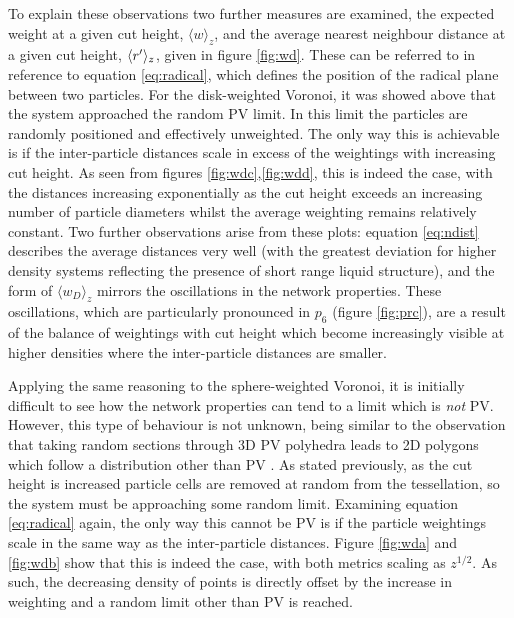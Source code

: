 To explain these observations two further measures are examined, the expected weight at a given cut height, $\langle w \rangle_z$, and the average nearest neighbour distance at a given cut height, $\langle r^\prime \rangle_z$, given in figure \ref{fig:wd}.
These can be referred to in reference to equation \eqref{eq:radical}, which defines the position of the radical plane between two particles.
For the disk\--weighted Voronoi, it was showed above that the system approached the random PV limit.
In this limit the particles are randomly positioned and effectively unweighted. 
The only way this is achievable is if the inter\--particle distances scale in excess of the weightings with increasing cut height.
As seen from figures \ref{fig:wdc},\ref{fig:wdd}, this is indeed the case, with the distances increasing exponentially as the cut height exceeds an increasing number of particle diameters whilst the average weighting remains relatively constant.
Two further observations arise from these plots: equation \eqref{eq:ndist} describes the average distances very well (with the greatest deviation for higher density systems reflecting the presence of short range liquid structure), and the form of $\langle w_D\rangle_z$ mirrors the oscillations in the network properties.
These oscillations, which are particularly pronounced in $p_6$ (figure \ref{fig:prc}), are a result of the balance of weightings with cut height which become increasingly visible at higher densities where the inter\--particle distances are smaller.

Applying the same reasoning to the sphere\--weighted Voronoi, it is initially difficult to see how the network properties can tend to a limit which is \textit{not} PV.
However, this type of behaviour is not unknown, being similar to the observation that taking random sections through 3D PV polyhedra leads to 2D polygons which follow a distribution other than PV \cite{Hahn1994}.
As stated previously, as the cut height is increased particle cells are removed at random from the tessellation, so the system must be approaching some random limit.
Examining equation \eqref{eq:radical} again, the only way this cannot be PV is if the particle weightings scale in the same way as the inter\--particle distances.
Figure \ref{fig:wda} and \ref{fig:wdb} show that this is indeed the case, with both metrics scaling as $z^{1/2}$.
As such, the decreasing density of points is directly offset by the increase in weighting and a random limit other than PV is reached.

